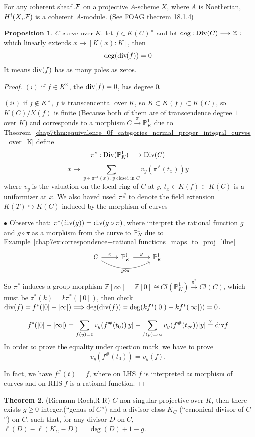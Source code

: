 \documentclass[11pt]{article}
\theoremstyle{definition}
\newtheorem{thm}{Theorem}[section]
\newtheorem{prop}[thm]{Proposition}
\newcommand{\proj}{\mathbb P}
\newcommand{\intg}{\mathbb Z}
\newcommand{\calf}{{\cal F}}
\renewcommand{\div}{\textnormal{div}}
\newcommand{\Div}{\textnormal{Div}}
\newcommand{\Lrta}{\Longrightarrow}
\newcommand{\lrta}{\longrightarrow}
\newcommand{\inj}{\hookrightarrow}
\begin{document}
For any coherent sheaf $\calf$ on a projective $A$-scheme $X$, where $A$ is Noetherian, $H^i(X,\calf)$ is a coherent $A$-module. (See FOAG theorem 18.1.4)
\begin{prop}
$C$ curve over $K$. let $f\in K(C)^\times$ and let $\deg:\Div(C)\lrta \intg:$ which linearly extends $ x\longmapsto[K(x):K]$, then
$$
\deg(\div(f))=0
$$
It means $\div(f)$ has as many poles as zeros.
\end{prop}
\begin{proof}
$(i)$ if $f\in K^\times$, the $\div(f)=0$, has degree $0$.

$(ii)$ if $f\notin K^\times$, $f$ is transcendental over $K$, so $K\subset K(f)\subset K(C)$, so $K(C)/K(f)$ is finite (Because both of them are of transcendence degree $1$ over $K$) and corresponds to a morphism
$C\overset{\pi}{\lrta}\proj^1_K$ due to Theorem~\ref{chap7thm:equivalence_0f_categories_normal_proper_integral_curves_over_K} define 
$$
\pi^*: \Div(\proj^1_K)\lrta \Div(C)
$$
$$
x\longmapsto \sum_{y\in \pi^{-1}(x), y\text{ closed in }C} v_y(\pi^{\#}(t_x))y
$$
where $v_y$ is the valuation on the local ring of $C$ at $y$, $t_x\in K(f)\subset K(C)$ is a uniformizer at $x$. We also haved used $\pi^\#$ to denote the field extension $K(T)\inj K(C)$ induced by the morphism of curves

$\bullet$ Observe that: $\pi^*(\div(g))=\div(g\circ \pi)$, where interpret the rational function $g$ and $g\circ \pi$ as a morphism from the curve to $\proj^1_K$ due to  Example~\ref{chap7ex:correspondence+rational functions_maps_to_proj_lilne}
$$
\begin{tikzcd}
C \arrow[r, "\pi"] \arrow[rr, "g\circ\pi"', bend right] & \proj^1_K \arrow[r, "g"] & \proj^1_K
\end{tikzcd}
$$
So $\pi^*$ induces a group morphism $\intg[\infty]=\intg[0]\cong Cl(\proj^1_K)\overset{\pi^*}{\lrta}Cl(C)$, which must be $\pi^*(k)=k\pi^*([0])$, then check $\div(f)=f^*([0]-[\infty])\Lrta \deg(\div(f))=\deg(kf^*([0])-kf^*([\infty]))=0$.

$$
f^*([0]-[\infty])=\sum_{f(y)=0}v_y(f^\# (t_0))[y]-\sum_{f(y)=\infty} v_y(f^\#(t_\infty))[y]\overset{?}{=}\div f
$$
In order to prove the equality under question mark, we have to prove
$$
v_y(f^\#(t_0))=v_y(f).
$$

In fact, we have $f^\#(t)=f$, where on LHS $f$ is interpreted as morphism of curves and on RHS $f$ is a rational function.

\end{proof}
\begin{thm}
(Riemann-Roch,R-R) $C$ non-singular projective over $K$, then there exists $g\geq 0$ integer,(``genus of $C$'') and a divisor class $K_C$ (``canonical divisor of $C$'') on $C$, such that, for any divisor $D$ on $C$, $\ell(D)-\ell(K_C-D)=\deg(D)+1-g$.
\end{thm}
\end{document}
